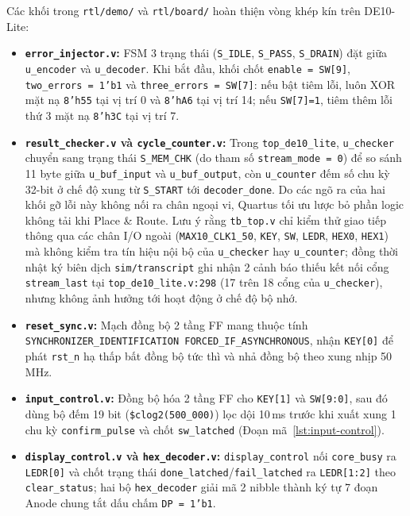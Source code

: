 \documentclass[11pt,a4paper]{report}
\begin{document}
Các khối trong \texttt{rtl/demo/} và \texttt{rtl/board/} hoàn thiện vòng khép kín trên DE10-Lite:
\begin{itemize}
    \item \textbf{\texttt{error\_injector.v}:} FSM 3 trạng thái (\texttt{S\_IDLE}, \texttt{S\_PASS}, \texttt{S\_DRAIN}) đặt giữa \texttt{u\_\allowbreak encoder} và \texttt{u\_\allowbreak decoder}. Khi bắt đầu, khối chốt \texttt{enable = SW[9]}, \texttt{two\_\allowbreak errors = 1'b1} và \texttt{three\_\allowbreak errors = SW[7]}: nếu bật tiêm lỗi, luôn XOR mặt nạ \texttt{8'h55} tại vị trí 0 và \texttt{8'hA6} tại vị trí 14; nếu \texttt{SW[7]=1}, tiêm thêm lỗi thứ 3 mặt nạ \texttt{8'h3C} tại vị trí 7.
    \item \textbf{\texttt{result\_checker.v} và \texttt{cycle\_counter.v}:} Trong \texttt{top\_de10\_lite}, \texttt{u\_checker} chuyển sang trạng thái \texttt{S\_MEM\_\allowbreak CHK} (do tham số \texttt{stream\_mode = 0}) để so sánh 11 byte giữa \texttt{u\_buf\_\allowbreak input} và \texttt{u\_buf\_\allowbreak output}, còn \texttt{u\_counter} đếm số chu kỳ 32-bit ở chế độ xung từ \texttt{S\_START} tới \texttt{decoder\_done}. Do các ngõ ra của hai khối gỡ lỗi này không nối ra chân ngoại vi, Quartus tối ưu lược bỏ phần logic không tải khi Place \& Route. Lưu ý rằng \texttt{tb\_top.v} chỉ kiểm thử giao tiếp thông qua các chân I/O ngoài (\texttt{MAX10\_CLK1\_50}, \texttt{KEY}, \texttt{SW}, \texttt{LEDR}, \texttt{HEX0}, \texttt{HEX1}) mà không kiểm tra tín hiệu nội bộ của \texttt{u\_checker} hay \texttt{u\_counter}; đồng thời nhật ký biên dịch \texttt{sim/transcript} ghi nhận 2 cảnh báo thiếu kết nối cổng \texttt{stream\_last} tại \texttt{top\_de10\_lite.v:298} (17 trên 18 cổng của \texttt{u\_checker}), nhưng không ảnh hưởng tới hoạt động ở chế độ bộ nhớ.
    \item \textbf{\texttt{reset\_sync.v}:} Mạch đồng bộ 2 tầng FF mang thuộc tính \texttt{SYNCHRONIZER\_\allowbreak IDENTIFICATION FORCED\_IF\_\allowbreak ASYNCHRONOUS}, nhận \texttt{KEY[0]} để phát \texttt{rst\_n} hạ thấp bất đồng bộ tức thì và nhả đồng bộ theo xung nhịp 50\,MHz.
    \item \textbf{\texttt{input\_control.v}:} Đồng bộ hóa 2 tầng FF cho \texttt{KEY[1]} và \texttt{SW[9:0]}, sau đó dùng bộ đếm 19 bit (\texttt{\$clog2(500\_000)}) lọc dội 10\,ms trước khi xuất xung 1 chu kỳ \texttt{confirm\_\allowbreak pulse} và chốt \texttt{sw\_\allowbreak latched} (Đoạn mã~\ref{lst:input-control}).
    \item \textbf{\texttt{display\_control.v} và \texttt{hex\_decoder.v}:} \texttt{display\_control} nối \texttt{core\_busy} ra \texttt{LEDR[0]} và chốt trạng thái \texttt{done\_latched}/\texttt{fail\_latched} ra \texttt{LEDR[1:2]} theo \texttt{clear\_status}; hai bộ \texttt{hex\_decoder} giải mã 2 nibble thành ký tự 7 đoạn Anode chung tắt dấu chấm \texttt{DP = 1'b1}.
\end{itemize}
\end{document}
